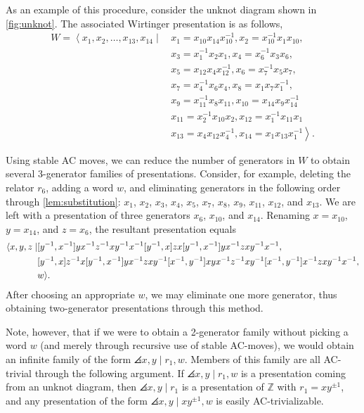 {As an example of this procedure, consider the unknot diagram shown in \autoref{fig:unknot}. The associated Wirtinger presentation is as follows,
\[
\begin{aligned}
W=\left\langle x_1, x_2, \dots, x_{13}, x_{14} \right. \mid\, &x_1=x_{10} x_{14} x_{10}^{-1}, x_2=x_{10}^{-1} x_1 x_{10},\\
&x_3=x_1^{-1} x_2 x_1, x_4=x_6^{-1} x_3 x_6,\\
&x_5=x_{12} x_4 x_{12}^{-1},x_6=x_7^{-1} x_5 x_7, \\
&x_7=x_4^{-1} x_6 x_4, x_8= x_1 x_7 x_1^{-1}, \\
&x_9=x_{11}^{-1} x_8 x_{11}, x_{10}=x_{14} x_9 x_{14}^{-1} \\
&x_{11}=x_2^{-1} x_{10} x_2, x_{12}=x_1^{-1} x_{11} x_1 \\
& x_{13}=x_4 x_{12} x_4^{-1}, x_{14}=x_1 x_{13} x_1^{-1}\left. \right\rangle .
\end{aligned}
\]

Using stable AC moves, we can reduce the number of generators in $W$ to obtain several 3-generator families of presentations. Consider, for example, deleting the relator $r_6$, adding a word $w$, and eliminating generators in the following order through \autoref{lem:substitution}: $x_1$, $x_2$, $x_3$, $x_4$, $x_5$, $x_7$, $x_8$, $x_9$, $x_{11}$, $x_{12}$, and $x_{13}$. We are left with a presentation of three generators $x_6$, $x_{10}$, and $x_{14}$. Renaming $x = x_{10}$, $y = x_{14}$, and $z=x_6$, the resultant presentation equals
\[
\begin{aligned}
\angles{x, y, z \mid & 
[y^{-1}, x^{-1}]
y x^{-1} z^{-1} x y^{-1} x^{-1} [y^{-1}, x]
z x [y^{-1}, x^{-1}]
y x^{-1} z x y^{-1} x^{-1}, \\
& %
[y^{-1}, x] z^{-1} x 
[y^{-1}, x^{-1}]
y x^{-1} z x y^{-1} 
[x^{-1}, y^{-1}]
x y x^{-1} z^{-1} x y^{-1} 
[x^{-1}, y^{-1}]
x^{-1} z x y^{-1} x^{-1}, \\
& w}.
\end{aligned}
\]
After choosing an appropriate $w$, we may eliminate one more generator, thus obtaining two-generator presentations through this method. 

\begin{remark}
Note, however, that if we were to obtain a 2-generator family without picking a word $w$ (and merely through recursive use of stable AC-moves), we would obtain an infinite family of the form $\angles{ x,y \mid r_1,w }$. Members of this family are all AC-trivial through the following argument. If $\angles{ x,y \mid r_1,w }$ is a presentation coming from an unknot diagram, then $\angles{ x,y \mid r_1 }$ is a presentation of $\mathbb{Z}$ with $r_1 = xy^{\pm 1}$, and any presentation of the form $\angles{ x,y \mid xy^{\pm 1},w }$ is easily AC-trivializable.
\end{remark}

}
